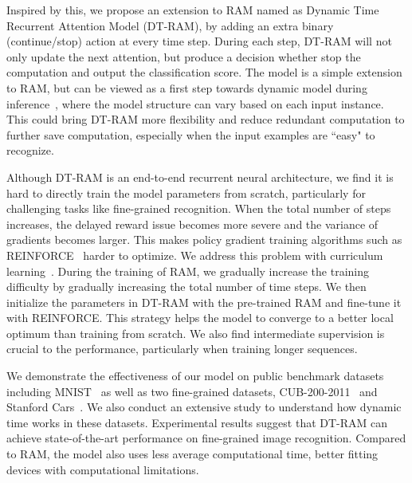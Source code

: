 \documentclass[10pt,twocolumn,letterpaper]{article}
\begin{document}
Inspired by this, we propose an extension to RAM named as Dynamic Time Recurrent Attention Model (DT-RAM), by adding an extra binary (continue/stop) action at every time step.
During each step, DT-RAM will not only update the next attention, but produce a decision whether stop the computation and output the classification score.
The model is a simple extension to RAM, but can be viewed as a first step towards dynamic model during inference~\cite{graves2016adaptive}, where the model structure can vary based on each input instance.
This could bring DT-RAM more flexibility and reduce redundant computation to further save computation, especially when the input examples are ``easy" to recognize.


Although DT-RAM is an end-to-end recurrent neural architecture, we find it is hard to directly train the model parameters from scratch, particularly for challenging tasks like fine-grained recognition.
When the total number of steps increases, the delayed reward issue becomes more severe and the variance of gradients becomes larger.
This makes policy gradient training algorithms such as REINFORCE~\cite{sutton1999policy} harder to optimize.
We address this problem with curriculum learning~\cite{bengio2009curriculum}.
During the training of RAM, we gradually increase the training difficulty by gradually increasing the total number of time steps.
We then initialize the parameters in DT-RAM with the pre-trained RAM and fine-tune it with REINFORCE.
This strategy helps the model to converge to a better local optimum than training from scratch.
We also find intermediate supervision is crucial to the performance, particularly when training longer sequences.

We demonstrate the effectiveness of our model on public benchmark datasets including MNIST~\cite{lecun1998gradient} as well as two fine-grained datasets, CUB-200-2011~\cite{wah2011caltech} and Stanford Cars~\cite{krause20133d}.
We also conduct an extensive study to understand how dynamic time works in these datasets.
Experimental results suggest that DT-RAM can achieve state-of-the-art performance on fine-grained image recognition.
Compared to RAM, the model also uses less average computational time, better fitting devices with computational limitations.
\end{document}
